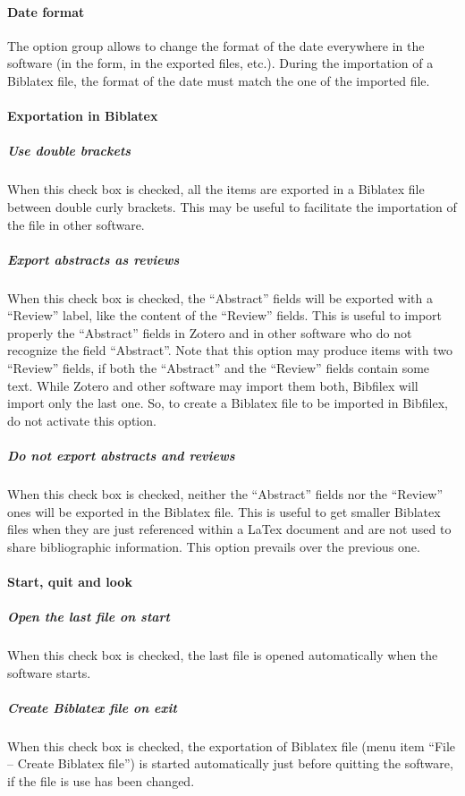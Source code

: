 \documentclass[a4paper,12pt]{report}
\begin{document}
\paragraph{Date format} The option group allows to change the format of the date everywhere in the software (in the form, in the exported files, etc.). During the importation of a Biblatex file, the format of the date must match the one of the imported file.

\paragraph{Exportation in Biblatex}

\subparagraph{Use double brackets} When this check box is checked, all the items are exported in a Biblatex file between double curly brackets. This may be useful to facilitate the importation of the file in other software.

\subparagraph{Export abstracts as reviews} When this check box is checked, the “Abstract” fields will be exported with a “Review” label, like the content of the “Review” fields. This is useful to import properly the “Abstract” fields in Zotero and in other software who do not recognize the field “Abstract”. Note that this option may produce items with two “Review” fields, if both the “Abstract” and the “Review” fields contain some text. While Zotero and other software may import them both, Bibfilex will import only the last one. So, to create a Biblatex file to be imported in Bibfilex, do not activate this option.

\subparagraph{Do not export abstracts and reviews} When this check box is checked, neither the “Abstract” fields nor the “Review” ones will be exported in the Biblatex file. This is useful to get smaller Biblatex files when they are just referenced within a LaTex document and are not used to share bibliographic information. This option prevails over the previous one.

\paragraph{Start, quit and look}

\subparagraph{Open the last file on start} When this check box is checked, the last file is opened automatically when the software starts.

\subparagraph{Create Biblatex file on exit} When this check box is checked, the exportation of Biblatex file (menu item “File -- Create Biblatex file”) is started automatically just before quitting the software, if the file is use has been changed.
\end{document}

